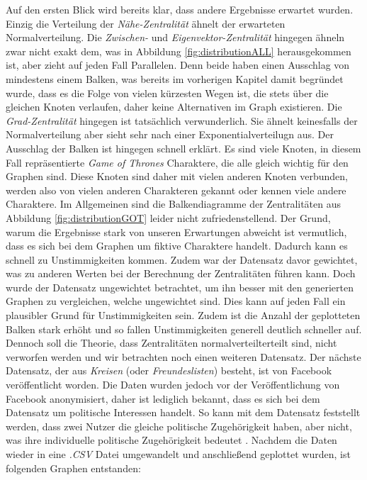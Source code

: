  Auf den ersten Blick wird bereits klar, dass andere Ergebnisse erwartet wurden. Einzig die Verteilung der \textit{Nähe-Zentralität} ähnelt der erwarteten Normalverteilung. Die \textit{Zwischen-} und \textit{Eigenvektor-Zentralität} hingegen ähneln zwar nicht exakt dem, was in Abbildung \ref{fig:distributionALL} herausgekommen ist, aber zieht auf jeden Fall Parallelen. Denn beide haben einen Ausschlag von mindestens einem Balken, was bereits im vorherigen Kapitel damit begründet wurde, dass es die Folge von vielen kürzesten Wegen ist, die stets über die gleichen
Knoten verlaufen, daher keine Alternativen im Graph existieren. Die \textit{Grad-Zentralität} hingegen ist tatsächlich verwunderlich. Sie ähnelt keinesfalls der Normalverteilung aber sieht sehr nach einer Exponentialverteilugn aus. Der Ausschlag der Balken ist hingegen schnell erklärt. Es sind viele Knoten, in diesem Fall repräsentierte \textit{Game of Thrones} Charaktere, die alle gleich wichtig für den Graphen sind. Diese Knoten sind daher mit vielen anderen Knoten verbunden, werden also von vielen anderen Charakteren gekannt oder kennen viele andere Charaktere. Im Allgemeinen sind die Balkendiagramme der Zentralitäten aus Abbildung \ref{fig:distributionGOT} leider nicht zufriedenstellend. Der Grund, warum die Ergebnisse stark von unseren Erwartungen abweicht ist vermutlich, dass es sich bei dem Graphen um fiktive Charaktere handelt. Dadurch kann es schnell zu Unstimmigkeiten kommen. Zudem war der Datensatz davor gewichtet, was zu anderen Werten bei der Berechnung der Zentralitäten führen kann. Doch wurde der Datensatz ungewichtet betrachtet, um ihn besser mit den generierten Graphen zu vergleichen, welche ungewichtet sind. Dies kann auf jeden Fall ein plausibler Grund für Unstimmigkeiten sein. Zudem ist die Anzahl der geplotteten Balken stark erhöht und so fallen Unstimmigkeiten generell deutlich schneller auf. \\ Dennoch soll die Theorie, dass Zentralitäten normalverteilterteilt sind, nicht verworfen werden und wir betrachten noch einen weiteren Datensatz. Der nächste Datensatz, der aus \textit{Kreisen} (oder \textit{Freundeslisten}) besteht, ist von Facebook veröffentlicht worden. Die Daten wurden jedoch vor der Veröffentlichung von Facebook anonymisiert, daher ist lediglich bekannt, dass es sich bei dem Datensatz um politische Interessen handelt. So kann mit dem Datensatz feststellt werden, dass zwei Nutzer die gleiche politische Zugehörigkeit haben, aber nicht, was ihre individuelle politische Zugehörigkeit bedeutet \cite{FBData}.
Nachdem die Daten wieder in eine \textit{.CSV} Datei umgewandelt und anschließend geplottet wurden, ist folgenden Graphen entstanden: 



